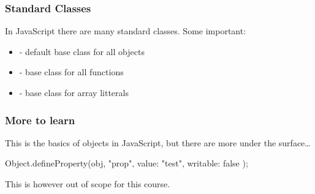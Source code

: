 \begin{frame}[fragile] \frametitle{Standard Classes}
In JavaScript there are many standard classes. Some important: 
\begin{itemize}
  \item {} - default base class for all objects
  \item {} - base class for all functions
  \item {} - base class for array litterals
\end{itemize}
\end{frame}

\begin{frame}[fragile] \frametitle{More to learn}

This is the basics of objects in JavaScript, but there are more under the surface\ldots
\vspace{8mm}
\begin{CodeBox}{}
Object.defineProperty(obj, "prop", {
    value: "test",
    writable: false
});
\end{CodeBox}
\vspace{8mm}
This is however out of scope for this course.
\end{frame}

